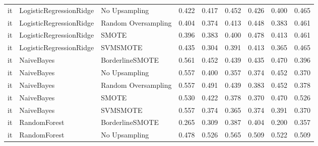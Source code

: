 \begin{tabular}{lllllllll}
      it &      LogisticRegressionRidge &       No Upsampling &     0.422 &                     0.417 &                 0.452 &                  0.426 &                                   0.400 &     0.465 \\
      it &      LogisticRegressionRidge & Random Oversampling &     0.404 &                     0.374 &                 0.413 &                  0.448 &                                   0.383 &     0.461 \\
      it &      LogisticRegressionRidge &               SMOTE &     0.396 &                     0.383 &                 0.400 &                  0.478 &                                   0.413 &     0.461 \\
      it &      LogisticRegressionRidge &            SVMSMOTE &     0.435 &                     0.304 &                 0.391 &                  0.413 &                                   0.365 &     0.465 \\
      it &                   NaiveBayes &     BorderlineSMOTE &     0.561 &                     0.452 &                 0.439 &                  0.435 &                                   0.470 &     0.396 \\
      it &                   NaiveBayes &       No Upsampling &     0.557 &                     0.400 &                 0.357 &                  0.374 &                                   0.452 &     0.370 \\
      it &                   NaiveBayes & Random Oversampling &     0.557 &                     0.491 &                 0.439 &                  0.383 &                                   0.452 &     0.378 \\
      it &                   NaiveBayes &               SMOTE &     0.530 &                     0.422 &                 0.378 &                  0.370 &                                   0.470 &     0.526 \\
      it &                   NaiveBayes &            SVMSMOTE &     0.557 &                     0.374 &                 0.365 &                  0.374 &                                   0.391 &     0.370 \\
      it &                 RandomForest &     BorderlineSMOTE &     0.265 &                     0.309 &                 0.387 &                  0.404 &                                   0.200 &     0.357 \\
      it &                 RandomForest &       No Upsampling &     0.478 &                     0.526 &                 0.565 &                  0.509 &                                   0.522 &     0.509 \\

\end{tabular}
